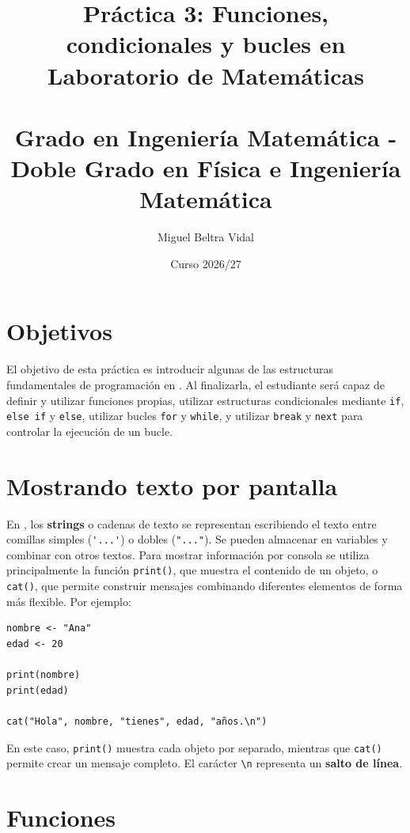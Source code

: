 \documentclass[11pt,a4paper]{article}
\title{\LARGE \textbf{Práctica 3: Funciones, condicionales y bucles en \R} \\[0.5em]
\Large Laboratorio de Matemáticas \\
\small \ \\
Grado en Ingeniería Matemática - Doble Grado en Física e Ingeniería Matemática}
\author{Miguel Beltra Vidal}
\date{Curso 2026/27}
\newcommand{\R}{\textcolor{azuluc}{\faIcon{r-project}}}
\theoremstyle{exercise}
\begin{document}
\maketitle

\section{Objetivos}

El objetivo de esta práctica es introducir algunas de las estructuras fundamentales de programación en \R. Al finalizarla, el estudiante será capaz de definir y utilizar funciones propias, utilizar estructuras condicionales mediante \texttt{if}, \texttt{else if} y \texttt{else}, utilizar bucles \texttt{for} y \texttt{while}, y utilizar \texttt{break} y \texttt{next} para controlar la ejecución de un bucle.


\section{Mostrando texto por pantalla}

En \R, los \textbf{strings} o cadenas de texto se representan escribiendo el texto entre comillas simples (\verb|'...'|) o dobles (\verb|"..."|). Se pueden almacenar en variables y combinar con otros textos. Para mostrar información por consola se utiliza principalmente la función \texttt{print()}, que muestra el contenido de un objeto, o \texttt{cat()}, que permite construir mensajes combinando diferentes elementos de forma más flexible. Por ejemplo:

\begin{lstlisting}[style=rstyle]
nombre <- "Ana"
edad <- 20

print(nombre)
print(edad)

cat("Hola", nombre, "tienes", edad, "años.\n")
\end{lstlisting}

\noindent En este caso, \texttt{print()} muestra cada objeto por separado, mientras que \texttt{cat()} permite crear un mensaje completo. El carácter \texttt{\textbackslash n} representa un \textbf{salto de línea}.



\section{Funciones}
\end{document}
